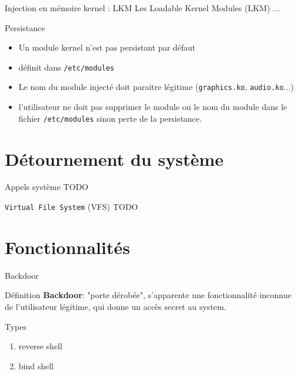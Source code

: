 \documentclass[10pt]{beamer}
\begin{document}
	\begin{frame}{Injection en mémoire kernel : LKM}
		Les Loadable Kernel Modules (LKM) ...
	\end{frame}

	\begin{frame}{Persistance}
		
		\begin{itemize}
			\item Un module kernel n'est pas persistant par défaut
			\item définit dans \texttt{/etc/modules}
			\item Le nom du module injecté doit paraitre légitime (\texttt{graphics.ko}, \texttt{audio.ko}...)
			\item \alert{l'utilisateur ne doit pas supprimer le module ou le nom du module dans le fichier \texttt{/etc/modules} sinon perte de la persistance}.
		\end{itemize}

		
		
	\end{frame}


\section{Détournement du système}

	
	\begin{frame}{Appels système}
		TODO
	\end{frame}

	\begin{frame}{\texttt{Virtual File System} (VFS)}
		TODO
	\end{frame}

\section{Fonctionnalités}

\begin{frame}{Backdoor }
	
	\begin{alertblock}{Définition}
		\textbf{Backdoor}: "porte dérobée", s'apparente une fonctionnalité inconnue de l'utilisateur légitime, qui donne un accès secret au system.
    \end{alertblock}
    
	\begin{alertblock}{Types}
		\begin{enumerate}
			\item reverse shell
			\item bind shell
		\end{enumerate}
    \end{alertblock}

\end{frame}
\end{document}
